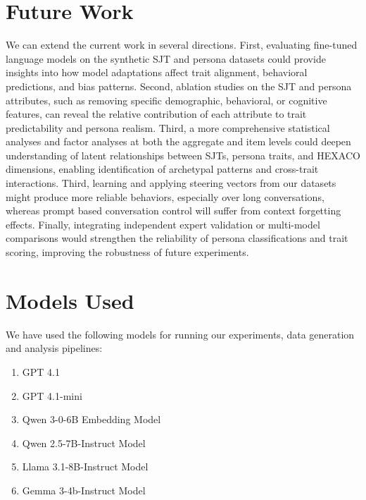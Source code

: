 \documentclass[11pt]{article}
\begin{document}
\section{Future Work}
\label{app:future_work}

We can extend the current work in several directions. First, evaluating fine-tuned language models on the synthetic SJT and persona datasets could provide insights into how model adaptations affect trait alignment, behavioral predictions, and bias patterns. Second, ablation studies on the SJT and persona attributes, such as removing specific demographic, behavioral, or cognitive features, can reveal the relative contribution of each attribute to trait predictability and persona realism. Third, a more comprehensive statistical analyses and factor analyses at both the aggregate and item levels could deepen understanding of latent relationships between SJTs, persona traits, and HEXACO dimensions, enabling identification of archetypal patterns and cross-trait interactions. Third, learning and applying steering vectors from our datasets might produce more reliable behaviors, especially over long conversations, whereas prompt based conversation control will suffer from context forgetting effects. Finally, integrating independent expert validation or multi-model comparisons would strengthen the reliability of persona classifications and trait scoring, improving the robustness of future experiments.

\section{Models Used}
\label{app:models_used}

We have used the following models for running our experiments, data generation and analysis pipelines:

\begin{enumerate}
    \item GPT 4.1 \citep{openai2024gpt4technicalreport}
    \item GPT 4.1-mini \citep{openai2024gpt4technicalreport}
    \item Qwen 3-0-6B Embedding Model \citep{qwen3}
    \item Qwen 2.5-7B-Instruct Model \citep{qwen2025qwen25technicalreport}
    \item Llama 3.1-8B-Instruct Model \citep{grattafiori2024llama3herdmodels}
    \item Gemma 3-4b-Instruct Model \citep{gemmateam2025gemma3technicalreport}
\end{enumerate}
\end{document}
